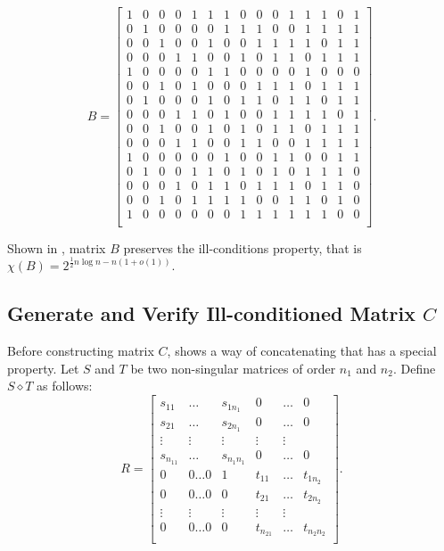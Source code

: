 \documentclass[11pt]{article}
\begin{document}
$$B=
\left[\begin{smallmatrix}
    1 & 0 & 0 & 0 & 1 & 1 & 1 & 0 & 0 & 0 & 1 & 1 & 1 & 0 & 1 \\
    0 & 1 & 0 & 0 & 0 & 0 & 1 & 1 & 1 & 0 & 0 & 1 & 1 & 1 & 1 \\
    0 & 0 & 1 & 0 & 0 & 1 & 0 & 0 & 1 & 1 & 1 & 1 & 0 & 1 & 1 \\
    0 & 0 & 0 & 1 & 1 & 0 & 0 & 1 & 0 & 1 & 1 & 0 & 1 & 1 & 1 \\
    1 & 0 & 0 & 0 & 0 & 1 & 1 & 0 & 0 & 0 & 0 & 1 & 0 & 0 & 0 \\
    0 & 0 & 1 & 0 & 1 & 0 & 0 & 0 & 1 & 1 & 1 & 0 & 1 & 1 & 1 \\
    0 & 1 & 0 & 0 & 0 & 1 & 0 & 1 & 1 & 0 & 1 & 1 & 0 & 1 & 1 \\
    0 & 0 & 0 & 1 & 1 & 0 & 1 & 0 & 0 & 1 & 1 & 1 & 1 & 0 & 1 \\
    0 & 0 & 1 & 0 & 0 & 1 & 0 & 1 & 0 & 1 & 1 & 0 & 1 & 1 & 1 \\
    0 & 0 & 0 & 1 & 1 & 0 & 0 & 1 & 1 & 0 & 0 & 1 & 1 & 1 & 1 \\
    1 & 0 & 0 & 0 & 0 & 0 & 1 & 0 & 0 & 1 & 1 & 0 & 0 & 1 & 1 \\
    0 & 1 & 0 & 0 & 1 & 1 & 0 & 1 & 0 & 1 & 0 & 1 & 1 & 1 & 0 \\
    0 & 0 & 0 & 1 & 0 & 1 & 1 & 0 & 1 & 1 & 1 & 0 & 1 & 1 & 0 \\
    0 & 0 & 1 & 0 & 1 & 1 & 1 & 1 & 0 & 0 & 1 & 1 & 0 & 1 & 0 \\
    1 & 0 & 0 & 0 & 0 & 0 & 0 & 1 & 1 & 1 & 1 & 1 & 1 & 0 & 0 \\
\end{smallmatrix}\right].
$$

Shown in \cite{ALON1997133}, matrix $B$ preserves the ill-conditions property, that is $\chi(B)=2^{\frac{1}{2}n\log n-n(1+o(1))}$.

\subsection{Generate and Verify Ill-conditioned Matrix $C$}
Before constructing matrix $C$, \cite{ALON1997133} shows a way of concatenating that has a special property. Let $S$ and $T$ be two non-singular matrices of order $n_1$ and $n_2$. Define $S \diamond T$ as follows:
$$R=
\left[\begin{smallmatrix}
    s_{11} & \dots & s_{1n_1} & 0 & \dots  & 0 \\
    s_{21} & \dots & s_{2n_1} & 0 & \dots  & 0 \\
    \vdots & \vdots & \vdots & \vdots & \vdots \\
    s_{n_11} & \dots & s_{n_1n_1} & 0 & \dots  & 0 \\
    0 & 0 \dots 0 & 1 & t_{11} & \dots & t_{1n_2} \\
    0 & 0 \dots 0 & 0 & t_{21} & \dots & t_{2n_2} \\
    \vdots & \vdots & \vdots & \vdots & \vdots \\
    0 & 0 \dots 0 & 0 & t_{n_21} & \dots & t_{n_2n_2} \\
\end{smallmatrix}\right].
$$
\end{document}
